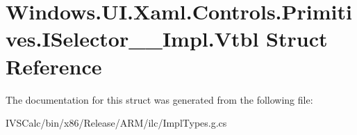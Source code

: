 \hypertarget{struct_windows_1_1_u_i_1_1_xaml_1_1_controls_1_1_primitives_1_1_i_selector_____impl_1_1_vtbl}{}\section{Windows.\+U\+I.\+Xaml.\+Controls.\+Primitives.\+I\+Selector\+\_\+\+\_\+\+Impl.\+Vtbl Struct Reference}
\label{struct_windows_1_1_u_i_1_1_xaml_1_1_controls_1_1_primitives_1_1_i_selector_____impl_1_1_vtbl}


The documentation for this struct was generated from the following file\+:\begin{DoxyCompactItemize}
\item 
I\+V\+S\+Calc/bin/x86/\+Release/\+A\+R\+M/ilc/Impl\+Types.\+g.\+cs\end{DoxyCompactItemize}
